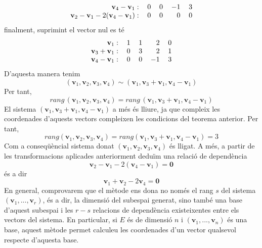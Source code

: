 \begin{solucio}
\begin{equation*}
\begin{tabular}{rrrrr}
$\mathbf{v}_{4}-\mathbf{v}_{1}:$ & $0$ & $0$ & $-1$ & $3$ \\ 
$\mathbf{v}_{2}-\mathbf{v}_{1}-2(\mathbf{v}_{4}-\mathbf{v}_{1}):$ & $0$ & $0$
& $0$ & $0$%
\end{tabular}%
\end{equation*}%
finalment, suprimint el vector nul es té%
\begin{equation*}
\begin{tabular}{rrrrr}
$\mathbf{v}_{1}:$ & $1$ & $1$ & $2$ & $0$ \\ 
$\mathbf{v}_{3}+\mathbf{v}_{1}:$ & $0$ & $3$ & $2$ & $1$ \\ 
$\mathbf{v}_{4}-\mathbf{v}_{1}:$ & $0$ & $0$ & $-1$ & $3$%
\end{tabular}%
\end{equation*}%
D’aquesta manera tenim%
\begin{equation*}
(\mathbf{v}_{1},\mathbf{v}_{2},\mathbf{v}_{3},\mathbf{v}_{4})\sim (\mathbf{v}%
_{1},\mathbf{v}_{3}+\mathbf{v}_{1},\mathbf{v}_{4}-\mathbf{v}_{1})
\end{equation*}%
Per tant,%
\begin{equation*}
rang\,(\mathbf{v}_{1},\mathbf{v}_{2},\mathbf{v}_{3},\mathbf{v}_{4})=rang\,(%
\mathbf{v}_{1},\mathbf{v}_{3}+\mathbf{v}_{1},\mathbf{v}_{4}-\mathbf{v}_{1})
\end{equation*}%
El sistema $(\mathbf{v}_{1},\mathbf{v}_{3}+\mathbf{v}_{1},\mathbf{v}_{4}-%
\mathbf{v}_{1})$ a més és lliure, ja que compleix les coordenades d’aquests
vectors compleixen les condicions del teorema anterior. Per tant,%
\begin{equation*}
rang(\mathbf{v}_{1},\mathbf{v}_{2},\mathbf{v}_{3},\mathbf{v}_{4})=rang(%
\mathbf{v}_{1},\mathbf{v}_{3}+\mathbf{v}_{1},\mathbf{v}_{4}-\mathbf{v}_{1})=3
\end{equation*}%
Com a conseqüèncial sistema donat $(\mathbf{v}_{1},\mathbf{v}_{2},\mathbf{v}%
_{3},\mathbf{v}_{4})$ és lligat. A més, a partir de les
transformacions aplicades anteriorment deduïm una relació de
dependència%
\begin{equation*}
\mathbf{v}_{2}-\mathbf{v}_{1}-2(\mathbf{v}_{4}-\mathbf{v}_{1})=\mathbf{0}
\end{equation*}%
és a dir%
\begin{equation*}
\mathbf{v}_{1}+\mathbf{v}_{2}-2\mathbf{v}_{4}=\mathbf{0}
\end{equation*}%
En general, comprovarem que el mètode ens dona no només el rang $s$
del sistema $(\mathbf{v}_{1},...,\mathbf{v}_{r})$, és a dir, la dimensió del subespai generat, sino també una base d’aquest subespai i
les $r-s$ relacions de dependència existeixentes entre els vectors del
sistema. En particular, si $E$ és de dimensió $n$ i $(\mathbf{v%
}_{1},...,\mathbf{v}_{n})$ és una base, aquest mètode permet calculeu les
coordenades d’un vector qualsevol respecte d'aquesta base.
\end{solucio}

